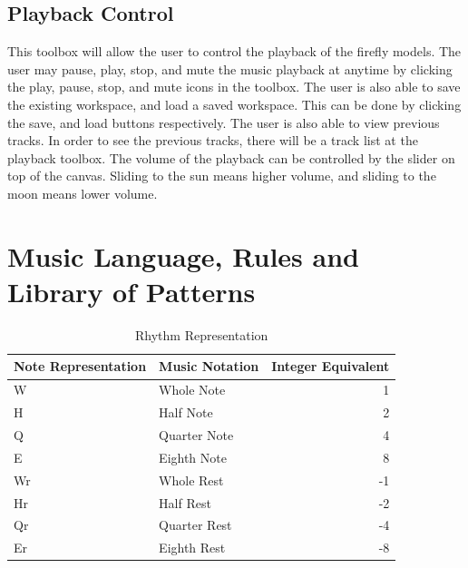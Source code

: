 \subsection{Playback Control}
This toolbox will allow the user to control the playback of the firefly models. The user may pause, play, stop, and mute the music playback at anytime by clicking the play, pause, stop, and mute icons in the toolbox. The user is also able to save the existing workspace, and load a saved workspace. This can be done by clicking the save, and load buttons respectively. The user is also able to view previous tracks. In order to see the previous tracks, there will be a track list at the playback toolbox. The volume of the playback can be controlled by the slider on top of the canvas. Sliding to the sun means higher volume, and sliding to the moon means lower volume.


\section{Music Language, Rules and Library of Patterns}

\begin{table}[H]
\caption{Rhythm Representation}
\label{musiclang}
\centering
\begin{tabular}{|l|l|r|} 
\hline
Note Representation & Music Notation & Integer Equivalent  \\ 
\hline
W                   & Whole Note     & 1                   \\ 
\hline
H                   & Half Note      & 2                   \\ 
\hline
Q                   & Quarter Note   & 4                   \\ 
\hline
E                   & Eighth Note    & 8                   \\ 
\hline
Wr                  & Whole Rest     & -1                  \\ 
\hline
Hr                  & Half Rest      & -2                  \\ 
\hline
Qr                  & Quarter Rest   & -4                  \\ 
\hline
Er                  & Eighth Rest    & -8                  \\
\hline
\end{tabular}
\end{table}

